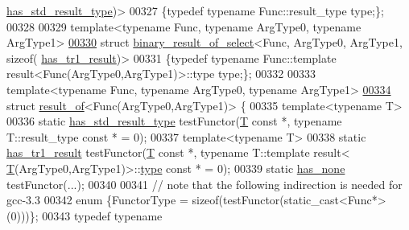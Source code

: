 \begin{DoxyCode}
      \hyperlink{struct_eigen_1_1internal_1_1has__std__result__type}{has\_std\_result\_type})>
00327 \{\textcolor{keyword}{typedef} \textcolor{keyword}{typename} Func::result\_type type;\};
00328 
00329 \textcolor{keyword}{template}<\textcolor{keyword}{typename} Func, \textcolor{keyword}{typename} ArgType0, \textcolor{keyword}{typename} ArgType1>
\hyperlink{struct_eigen_1_1internal_1_1binary__result__of__select_3_01_func_00_01_arg_type0_00_01_arg_type19eb2d03c93e1465fabde3b560e3be1a4}{00330} \textcolor{keyword}{struct }\hyperlink{struct_eigen_1_1internal_1_1binary__result__of__select}{binary\_result\_of\_select}<Func, ArgType0, ArgType1, sizeof(
      \hyperlink{struct_eigen_1_1internal_1_1has__tr1__result}{has\_tr1\_result})>
00331 \{\textcolor{keyword}{typedef} \textcolor{keyword}{typename} Func::template result<Func(ArgType0,ArgType1)>::type type;\};
00332 
00333 \textcolor{keyword}{template}<\textcolor{keyword}{typename} Func, \textcolor{keyword}{typename} ArgType0, \textcolor{keyword}{typename} ArgType1>
\hyperlink{struct_eigen_1_1internal_1_1result__of_3_01_func_07_arg_type0_00_01_arg_type1_08_4}{00334} \textcolor{keyword}{struct }\hyperlink{struct_eigen_1_1internal_1_1result__of}{result\_of}<Func(ArgType0,ArgType1)> \{
00335     \textcolor{keyword}{template}<\textcolor{keyword}{typename} T>
00336     \textcolor{keyword}{static} \hyperlink{struct_eigen_1_1internal_1_1has__std__result__type}{has\_std\_result\_type}    testFunctor(\hyperlink{group___sparse_core___module}{T} \textcolor{keyword}{const} *, \textcolor{keyword}{typename} T::result\_type \textcolor{keyword}{const} 
      * = 0);
00337     \textcolor{keyword}{template}<\textcolor{keyword}{typename} T>
00338     \textcolor{keyword}{static} \hyperlink{struct_eigen_1_1internal_1_1has__tr1__result}{has\_tr1\_result}         testFunctor(\hyperlink{group___sparse_core___module}{T} \textcolor{keyword}{const} *, \textcolor{keyword}{typename} T::template result<
      \hyperlink{group___sparse_core___module}{T}(ArgType0,ArgType1)>::\hyperlink{group___sparse_core___module}{type} \textcolor{keyword}{const} * = 0);
00339     \textcolor{keyword}{static} \hyperlink{struct_eigen_1_1internal_1_1has__none}{has\_none}               testFunctor(...);
00340 
00341     \textcolor{comment}{// note that the following indirection is needed for gcc-3.3}
00342     \textcolor{keyword}{enum} \{FunctorType = \textcolor{keyword}{sizeof}(testFunctor(static\_cast<Func*>(0)))\};
00343     \textcolor{keyword}{typedef} \textcolor{keyword}{typename} 

\end{DoxyCode}

